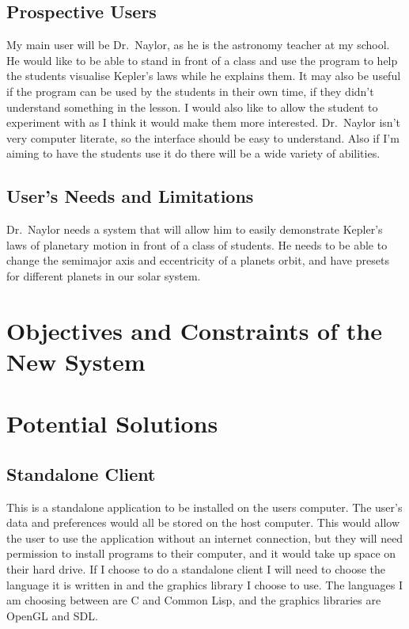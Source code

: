 \subsection{Prospective Users}
My main user will be Dr.~Naylor, as he is the astronomy teacher at my school. He
would like to be able to stand in front of a class and use the program to help
the students visualise Kepler's laws while he explains them. It may also be
useful if the program can be used by the students in their own time, if they
didn't understand something in the lesson. I would also like to allow the
student to experiment with as I think it would make them more interested.
Dr.~Naylor isn't very computer literate, so the interface should be easy to
understand. Also if I'm aiming to have the students use it do there will be a
wide variety of abilities. 

\subsection{User's Needs and Limitations} 
Dr.~Naylor needs a system that will allow him to easily demonstrate Kepler's
laws of planetary motion in front of a class of students. He needs to be able
to change the semimajor axis and eccentricity of a planets orbit, and have
presets for different planets in our solar system. 

\section{Objectives and Constraints of the New System}


\section{Potential Solutions}

\subsection{Standalone Client}
This is a standalone application to be installed on the users computer. The
user's data and preferences would all be stored on the host computer. This would
allow the user to use the application without an internet connection, but they
will need permission to install programs to their computer, and it would take up
space on their hard drive. If I choose to do a standalone client I will need to
choose the language it is written in and the graphics library I choose to use.
The languages I am choosing between are C and Common Lisp, and the graphics
libraries are OpenGL and SDL.

